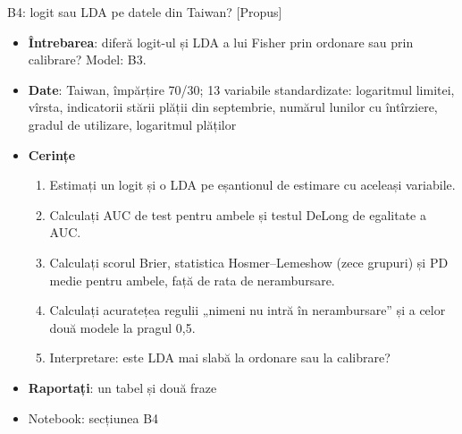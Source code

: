 \begin{frame}{B4: logit sau LDA pe datele din Taiwan? [Propus]}
\itemsize{\footnotesize}
\begin{itemize}
\item \textbf{Întrebarea}: diferă logit-ul și LDA a lui Fisher prin ordonare sau prin calibrare? Model: B3.
\item \textbf{Date}: Taiwan, împărțire 70/30; 13 variabile standardizate: logaritmul limitei, vîrsta, indicatorii stării plății din septembrie, numărul lunilor cu întîrziere, gradul de utilizare, logaritmul plăților
\item \textbf{Cerințe}
\begin{enumerate}
    \item Estimați un logit și o LDA pe eșantionul de estimare cu aceleași variabile.
    \item Calculați AUC de test pentru ambele și testul DeLong de egalitate a AUC.
    \item Calculați scorul Brier, statistica Hosmer--Lemeshow (zece grupuri) și PD medie pentru ambele, față de rata de nerambursare.
    \item Calculați acuratețea regulii „nimeni nu intră în nerambursare” și a celor două modele la pragul 0,5.
    \item Interpretare: este LDA mai slabă la ordonare sau la calibrare?
\end{enumerate}
\item \textbf{Raportați}: un tabel și două fraze
\item Notebook: secțiunea B4
\end{itemize}
\end{frame}

